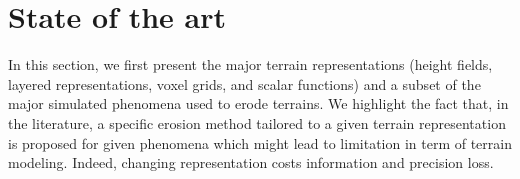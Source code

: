 \section{State of the art}
\label{sec:erosion_state_of_the_art}
In this section, we first present the major terrain representations (height fields, layered representations, voxel grids, and scalar functions) and a subset of the major simulated phenomena used to erode terrains. We highlight the fact that, in the literature, a specific erosion method tailored to a given terrain representation is proposed for given phenomena which might lead to limitation in term of terrain modeling. Indeed, changing representation costs information and precision loss.





